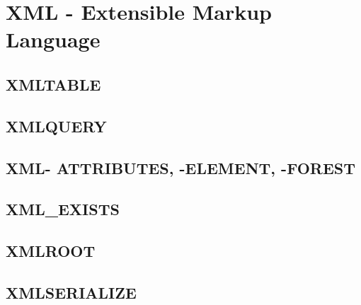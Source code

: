 \section[XML]{XML - Extensible Markup Language}
\label{sec:xml}

\subsection{XMLTABLE}
\label{sec:xml.xml_table}

\subsection{XMLQUERY}
\label{sec:xml.xml_query}

\subsection{XML- ATTRIBUTES, -ELEMENT, -FOREST}
\label{sec:xml.xml_attr-ele-fore}

\subsection{XML\_EXISTS}
\label{sec:xml.xml_exists}

\subsection{XMLROOT}
\label{sec:xml.xml_root}

\subsection{XMLSERIALIZE}
\label{sec:xml.xml_serialize}

